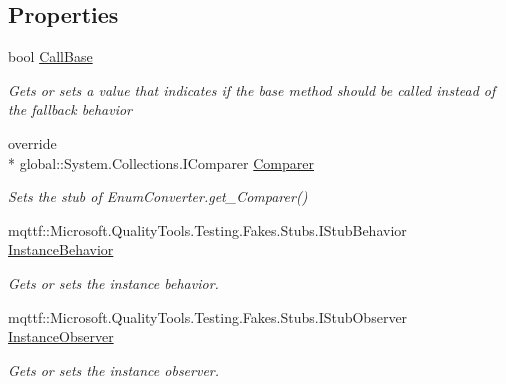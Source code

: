 \subsection*{Properties}
\begin{DoxyCompactItemize}
\item 
bool \hyperlink{class_system_1_1_component_model_1_1_fakes_1_1_stub_enum_converter_ab2e8f4b613d35bc7494e3b42841ab710}{Call\-Base}
\begin{DoxyCompactList}\small\item\em Gets or sets a value that indicates if the base method should be called instead of the fallback behavior\end{DoxyCompactList}\item 
override \\*
global\-::\-System.\-Collections.\-I\-Comparer \hyperlink{class_system_1_1_component_model_1_1_fakes_1_1_stub_enum_converter_a95dc70690fb11100819f73cedd5303af}{Comparer}
\begin{DoxyCompactList}\small\item\em Sets the stub of Enum\-Converter.\-get\-\_\-\-Comparer()\end{DoxyCompactList}\item 
mqttf\-::\-Microsoft.\-Quality\-Tools.\-Testing.\-Fakes.\-Stubs.\-I\-Stub\-Behavior \hyperlink{class_system_1_1_component_model_1_1_fakes_1_1_stub_enum_converter_a9cf7f4eb8dbd4359a05cc6087e441c3c}{Instance\-Behavior}
\begin{DoxyCompactList}\small\item\em Gets or sets the instance behavior.\end{DoxyCompactList}\item 
mqttf\-::\-Microsoft.\-Quality\-Tools.\-Testing.\-Fakes.\-Stubs.\-I\-Stub\-Observer \hyperlink{class_system_1_1_component_model_1_1_fakes_1_1_stub_enum_converter_af2fc02d543ef5100ac20dd1f5cfa7b8b}{Instance\-Observer}
\begin{DoxyCompactList}\small\item\em Gets or sets the instance observer.\end{DoxyCompactList}\end{DoxyCompactItemize}


